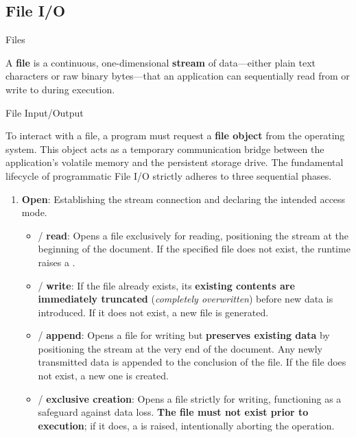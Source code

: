 \documentclass[10pt]{article}
\begin{document}
  \subsection{File I/O}

    \begin{core}{Files}

      A \textbf{file} is a continuous, one-dimensional \textbf{stream} of data---either plain text characters or raw binary bytes---that an application can sequentially read from or write to during execution.

    \end{core}

    \begin{core}{File Input/Output}

      To interact with a file, a program must request a \textbf{file object} from the operating system. This object acts as a temporary communication bridge between the application's volatile memory and the persistent storage drive. The fundamental lifecycle of programmatic File I/O strictly adheres to three sequential phases.

      \begin{enumerate}

        \item \textbf{Open}: Establishing the stream connection and declaring the intended access mode.

        \begin{itemize}

          \item {} / \textbf{read}: Opens a file exclusively for reading, positioning the stream at the beginning of the document. If the specified file does not exist, the runtime raises a .

          \item {} / \textbf{write}: If the file already exists, its \textbf{existing contents are immediately truncated} (\textit{completely overwritten}) before new data is introduced. If it does not exist, a new file is generated.

          \item {} / \textbf{append}: Opens a file for writing but \textbf{preserves existing data} by positioning the stream at the very end of the document. Any newly transmitted data is appended to the conclusion of the file. If the file does not exist, a new one is created.

          \item {} / \textbf{exclusive creation}: Opens a file strictly for writing, functioning as a safeguard against data loss. \textbf{The file must not exist prior to execution}; if it does, a  is raised, intentionally aborting the operation.


\end{itemize}
\end{enumerate}
\end{core}
\end{document}
